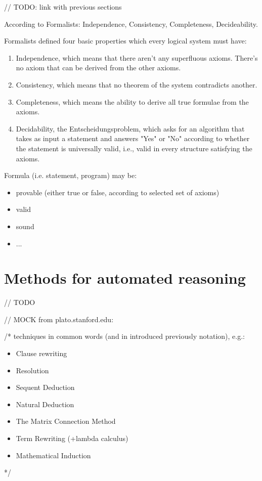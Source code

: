 \documentclass[article]{aaltoseries}
\begin{document}
// TODO: link with previous sections

According to Formalists: Independence, Consistency, Completeness, Decideability.

Formalists defined four basic properties which every logical system must have:
\begin{enumerate}
	\itemsep0em
	\item Independence, which means that there aren’t any superfluous axioms. There’s no axiom that can be derived from the other axioms.
	\item Consistency, which means that no theorem of the system contradicts another.
	\item Completeness, which means the ability to derive all true formulae from the axioms.
	\item Decidability, the Entscheidungsproblem, which asks for an algorithm that takes as input a statement and answers "Yes" or "No" according to whether the statement is universally valid, i.e., valid in every structure satisfying the axioms.
\end{enumerate}

Formula (i.e. statement, program) may be:
\begin{itemize}
	\itemsep0em
	\item provable (either true or false, according to selected set of axioms)
	\item valid
	\item sound
	\item ...
\end{itemize}


\section{Methods for automated reasoning}
\label{sec:auto_reasoning}

// TODO

// MOCK from plato.stanford.edu:  %

/* techniques in common words (and in introduced previously notation), e.g.: 
\begin{itemize}
	\itemsep0em
	\item Clause rewriting
	\item Resolution
	\item Sequent Deduction
	\item Natural Deduction
	\item The Matrix Connection Method
	\item Term Rewriting (+lambda calculus)
	\item Mathematical Induction
\end{itemize}
*/
\end{document}
